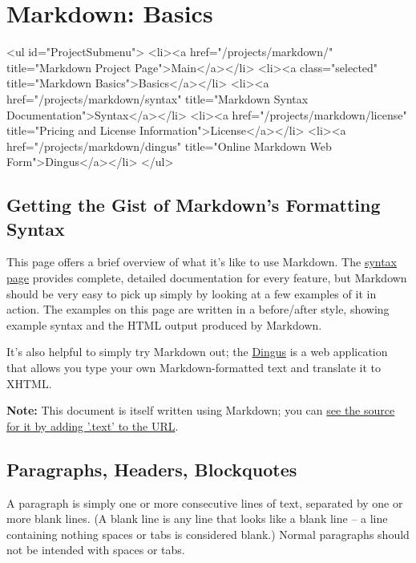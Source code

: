 \section*{Markdown: Basics}


<ul id="ProjectSubmenu">
    <li><a href="/projects/markdown/" title="Markdown Project Page">Main</a></li>
    <li><a class="selected" title="Markdown Basics">Basics</a></li>
    <li><a href="/projects/markdown/syntax" title="Markdown Syntax Documentation">Syntax</a></li>
    <li><a href="/projects/markdown/license" title="Pricing and License Information">License</a></li>
    <li><a href="/projects/markdown/dingus" title="Online Markdown Web Form">Dingus</a></li>
</ul>

\subsection*{Getting the Gist of Markdown's Formatting Syntax}




This page offers a brief overview of what it's like to use Markdown.
The \href{/projects/markdown/syntax}{syntax page} provides complete, detailed documentation for
every feature, but Markdown should be very easy to pick up simply by
looking at a few examples of it in action. The examples on this page
are written in a before/after style, showing example syntax and the
HTML output produced by Markdown.



It's also helpful to simply try Markdown out; the \href{/projects/markdown/dingus}{Dingus} is a
web application that allows you type your own Markdown-formatted text
and translate it to XHTML.



\textbf{Note:} This document is itself written using Markdown; you
can \href{/projects/markdown/basics.text}{see the source for it by adding '.text' to the URL}.

\subsection*{Paragraphs, Headers, Blockquotes}




A paragraph is simply one or more consecutive lines of text, separated
by one or more blank lines. (A blank line is any line that looks like a
blank line -- a line containing nothing spaces or tabs is considered
blank.) Normal paragraphs should not be intended with spaces or tabs.



